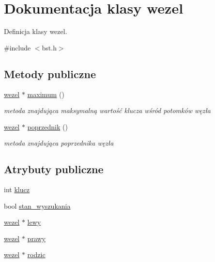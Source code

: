 \hypertarget{classwezel}{}\section{Dokumentacja klasy wezel}
\label{classwezel}


Definicja klasy wezel.  




{\ttfamily \#include $<$bst.\+h$>$}

\subsection*{Metody publiczne}
\begin{DoxyCompactItemize}
\item 
\mbox{\hyperlink{classwezel}{wezel}} $\ast$ \mbox{\hyperlink{classwezel_a80ba6462ff084575ec6ceff70328b309}{maximum}} ()
\begin{DoxyCompactList}\small\item\em metoda znajdująca maksymalną wartość klucza wśród potomków węzła \end{DoxyCompactList}\item 
\mbox{\hyperlink{classwezel}{wezel}} $\ast$ \mbox{\hyperlink{classwezel_a9f30c6f8458f88551aa2ac1594b71055}{poprzednik}} ()
\begin{DoxyCompactList}\small\item\em metoda znajdująca poprzednika węzła \end{DoxyCompactList}\end{DoxyCompactItemize}
\subsection*{Atrybuty publiczne}
\begin{DoxyCompactItemize}
\item 
int \mbox{\hyperlink{classwezel_a974b7f21addfce76b123aa07ee0287c1}{klucz}}
\item 
bool \mbox{\hyperlink{classwezel_a24d936575a56379d5cebe8f45ef049f1}{stan\+\_\+wyszukania}}
\item 
\mbox{\hyperlink{classwezel}{wezel}} $\ast$ \mbox{\hyperlink{classwezel_a5ac913d2c2d91515dde416dfa9254a12}{lewy}}
\item 
\mbox{\hyperlink{classwezel}{wezel}} $\ast$ \mbox{\hyperlink{classwezel_ae890c73ae84fb0097a715d739fad9ea0}{prawy}}
\item 
\mbox{\hyperlink{classwezel}{wezel}} $\ast$ \mbox{\hyperlink{classwezel_a580c686473d5fa801cd15496f61da7f7}{rodzic}}
\end{DoxyCompactItemize}


